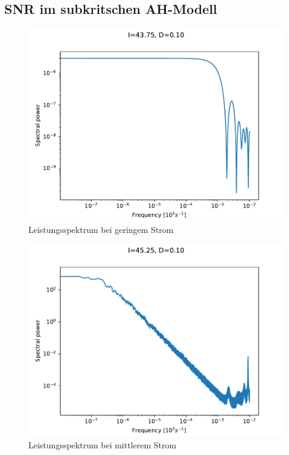 \documentclass[12pt,a4paper]{article}
\begin{document}
\subsection{SNR im subkritschen AH-Modell}
\begin{figure}[H]
	\centering
	\includegraphics[scale=1]{spanhopfd10klein.pdf}\caption{Leistungsspektrum bei geringem Strom}
	\label{powerspD01klein}
\end{figure}
\begin{figure}[H]
	\centering
	\includegraphics[scale=1]{spanhopfd10mittel.pdf}\caption{Leistungsspektrum bei mittlerem Strom}
	\label{powerspD01mittel}
\end{figure}
\end{document}
